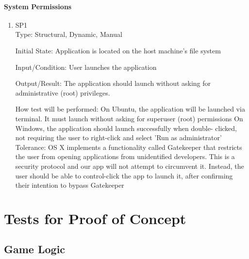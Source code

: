 \documentclass[12pt, titlepage]{article}
\begin{document}
	\paragraph{System Permissions}
	\begin{enumerate}
		\item{SP1\\}
		Type: Structural, Dynamic, Manual
		
		Initial State: Application is located on the host machine's file system
		
		Input/Condition: User launches the application
		
		Output/Result: The application should launch without asking for administrative
		(root) privileges.
		
		How test will be performed: On Ubuntu, the application will be launched via
		terminal. It must launch without asking for superuser (root) permissions
		\newline On Windows, the application should launch successfully when double-
		clicked, not requiring the user to right-click and select 'Run as 
		administrator'
		\newline Tolerance: OS X implements a functionality called Gatekeeper that
		restricts the user from opening applications from unidentified developers. 
		This is a security protocol and our app will not attempt to circumvent it.
		Instead, the user should be able to control-click the app to launch it, after
		confirming their intention to bypass Gatekeeper
	\end{enumerate}

	\section{Tests for Proof of Concept}
	\subsection{Game Logic}
	
\end{document}
